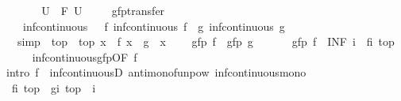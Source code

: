 \begin{isabellebody}
\ \ \ \ \isamarkupfalse%
\ \isamarkupfalse%
\ {\isachardoublequoteopen}{\isacharquery}U\ {\isasymle}\ F\ {\isacharquery}U{\isachardoublequoteclose}\ \isacommand{{\isachardot}}\isamarkupfalse%
\isanewline
\ \ \isamarkupfalse%
\isanewline
{}\isamarkupfalse%
%
\endisatagproof
{\isafoldproof}%
%
\isadelimproof
\isanewline
%
\endisadelimproof
\isanewline
{}\isamarkupfalse%
\ gfp{\isacharunderscore}transfer{\isacharcolon}\isanewline
\ \ \ {\isasymalpha}{\isacharcolon}\ {\isachardoublequoteopen}inf{\isacharunderscore}continuous\ {\isasymalpha}{\isachardoublequoteclose}\ \ f{\isacharcolon}\ {\isachardoublequoteopen}inf{\isacharunderscore}continuous\ f{\isachardoublequoteclose}\ \ g{\isacharcolon}\ {\isachardoublequoteopen}inf{\isacharunderscore}continuous\ g{\isachardoublequoteclose}\isanewline
\ \ \ {\isacharbrackleft}simp{\isacharbrackright}{\isacharcolon}\ {\isachardoublequoteopen}{\isasymalpha}\ top\ {\isacharequal}\ top{\isachardoublequoteclose}\ {\isachardoublequoteopen}{\isasymAnd}x{\isachardot}\ {\isasymalpha}\ {\isacharparenleft}f\ x{\isacharparenright}\ {\isacharequal}\ g\ {\isacharparenleft}{\isasymalpha}\ x{\isacharparenright}{\isachardoublequoteclose}\isanewline
\ \ \ {\isachardoublequoteopen}{\isasymalpha}\ {\isacharparenleft}gfp\ f{\isacharparenright}\ {\isacharequal}\ gfp\ g{\isachardoublequoteclose}\isanewline
%
\isadelimproof
%
\endisadelimproof
%
\isatagproof
{}\isamarkupfalse%
\ {\isacharminus}\isanewline
\ \ \isamarkupfalse%
\ {\isachardoublequoteopen}{\isasymalpha}\ {\isacharparenleft}gfp\ f{\isacharparenright}\ {\isacharequal}\ {\isacharparenleft}INF\ i{\isachardot}\ {\isasymalpha}\ {\isacharparenleft}{\isacharparenleft}f{\isacharcircum}{\isacharcircum}i{\isacharparenright}\ top{\isacharparenright}{\isacharparenright}{\isachardoublequoteclose}\isanewline
\ \ \ \ \isamarkupfalse%
\ inf{\isacharunderscore}continuous{\isacharunderscore}gfp{\isacharbrackleft}OF\ f{\isacharbrackright}\ \isamarkupfalse%
\ {\isacharparenleft}intro\ f\ {\isasymalpha}\ inf{\isacharunderscore}continuousD\ antimono{\isacharunderscore}funpow\ inf{\isacharunderscore}continuous{\isacharunderscore}mono{\isacharparenright}\isanewline
\ \ \isamarkupfalse%
\ \isamarkupfalse%
\ {\isachardoublequoteopen}{\isasymalpha}\ {\isacharparenleft}{\isacharparenleft}f{\isacharcircum}{\isacharcircum}i{\isacharparenright}\ top{\isacharparenright}\ {\isacharequal}\ {\isacharparenleft}g{\isacharcircum}{\isacharcircum}i{\isacharparenright}\ top{\isachardoublequoteclose}\ \ i\isanewline

\end{isabellebody}
